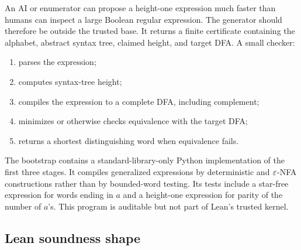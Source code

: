 \documentclass{amsart}
\begin{document}
An AI or enumerator can propose a height-one expression much faster than humans can inspect a large Boolean regular expression.  The generator should therefore be outside the trusted base.  It returns a finite certificate containing the alphabet, abstract syntax tree, claimed height, and target DFA.  A small checker:
\begin{enumerate}
  \item parses the expression;
  \item computes syntax-tree height;
  \item compiles the expression to a complete DFA, including complement;
  \item minimizes or otherwise checks equivalence with the target DFA;
  \item returns a shortest distinguishing word when equivalence fails.
\end{enumerate}

\begin{center}
\end{center}

The bootstrap contains a standard-library-only Python implementation of the first three stages.  It compiles generalized expressions by deterministic and $\varepsilon$-NFA constructions rather than by bounded-word testing.  Its tests include a star-free expression for words ending in $a$ and a height-one expression for parity of the number of $a$'s.  This program is auditable but not part of Lean's trusted kernel.

\subsection{Lean soundness shape}
\end{document}

